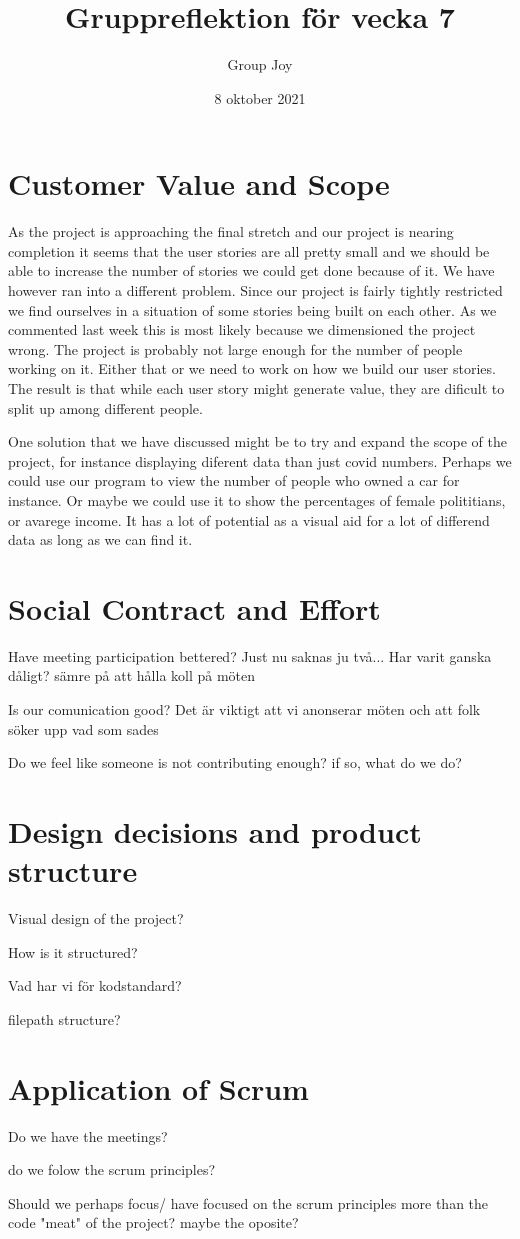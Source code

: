 \documentclass{scrartcl}
\begin{document}
\title{Gruppreflektion för vecka 7}
\author{Group Joy}
\date{8 oktober 2021}
\maketitle

\section{Customer Value and Scope}
As the project is approaching the final stretch and our project is nearing completion it seems that the user stories are all pretty small and we should be able to increase the number of stories we could get done because of it. We have however ran into a different problem. Since our project is fairly tightly restricted we find ourselves in a situation of some stories being built on each other. As we commented last week this is most likely because we dimensioned the project wrong. The project is probably not large enough for the number of people working on it. Either that or we need to work on how we build our user stories. The result is that while each user story might generate value, they are dificult to split up among different people. 

One solution that we have discussed might be to try and expand the scope of the project, for instance displaying diferent data than just covid numbers. Perhaps we could use our program to view the number of people who owned a car for instance. Or maybe we could use it to show the percentages of female polititians, or avarege income. It has a lot of potential as a visual aid for a lot of differend data as long as we can find it. 


\section{Social Contract and Effort}
Have meeting participation bettered?
Just nu saknas ju två...
Har varit ganska dåligt? sämre på att hålla koll på möten

Is our comunication good? 
Det är viktigt att vi anonserar möten 
och att folk söker upp vad som sades

Do we feel like someone is not contributing enough? if so, what do we do? 


\section{Design decisions and product structure}
Visual design of the project? 

How is it structured? 

Vad har vi för kodstandard? 

filepath structure? 

\section{Application of Scrum}
Do we have the meetings? 

do we folow the scrum principles? 

Should we perhaps focus/ have focused on the scrum principles more than the code "meat" of the project? maybe the oposite? 
\end{document}
